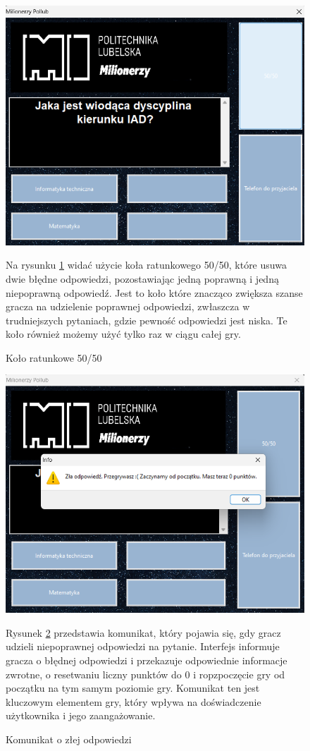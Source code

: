 \documentclass[]{article}
\begin{document}
\begin{figure}[!h]
	\includegraphics[width=\linewidth]{5.png}
	\caption{Koło ratunkowe 50/50}
	\label{rys:5}
	Na rysunku \ref{rys:5} widać użycie koła ratunkowego 50/50, które usuwa dwie błędne odpowiedzi, pozostawiając jedną poprawną i jedną niepoprawną odpowiedź. Jest to koło które znacząco zwiększa szanse gracza na udzielenie poprawnej odpowiedzi, zwłaszcza w trudniejszych pytaniach, gdzie pewność odpowiedzi jest niska. Te koło również możemy użyć tylko raz w ciągu całej gry.
\end{figure}

\begin{figure}[!h]
	\includegraphics[width=\linewidth]{6.png}
	\caption{Komunikat o złej odpowiedzi}
	\label{rys:6}
	Rysunek \ref{rys:6} przedstawia komunikat, który pojawia się, gdy gracz udzieli niepoprawnej odpowiedzi na pytanie. Interfejs informuje gracza o błędnej odpowiedzi i przekazuje odpowiednie informacje zwrotne, o resetwaniu liczny punktów do 0 i ropzpoczęcie gry od początku na tym samym poziomie gry. Komunikat ten jest kluczowym elementem gry, który wpływa na doświadczenie użytkownika i jego zaangażowanie.
\end{figure}
\end{document}
